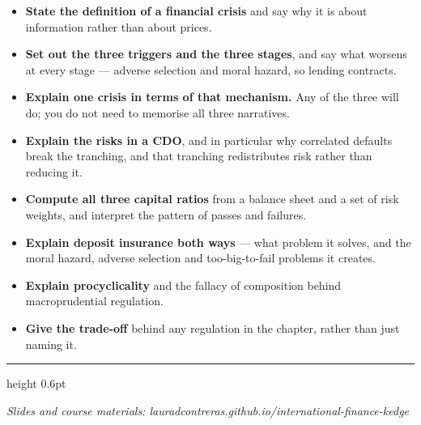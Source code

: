 \documentclass[11pt,a4paper]{article}
\begin{document}
\begin{itemize}
\item \textbf{State the definition of a financial crisis} and say why it is
about information rather than about prices.
\item \textbf{Set out the three triggers and the three stages}, and say what
worsens at every stage --- adverse selection and moral hazard, so lending
contracts.
\item \textbf{Explain one crisis in terms of that mechanism.} Any of the three
will do; you do not need to memorise all three narratives.
\item \textbf{Explain the risks in a CDO}, and in particular why correlated
defaults break the tranching, and that tranching redistributes risk rather than
reducing it.
\item \textbf{Compute all three capital ratios} from a balance sheet and a set
of risk weights, and interpret the pattern of passes and failures.
\item \textbf{Explain deposit insurance both ways} --- what problem it solves,
and the moral hazard, adverse selection and too-big-to-fail problems it creates.
\item \textbf{Explain procyclicality} and the fallacy of composition behind
macroprudential regulation.
\item \textbf{Give the trade-off} behind any regulation in the chapter, rather
than just naming it.
\end{itemize}

\vspace{8pt}
{\color{ifrule}\hrule height 0.6pt}
\vspace{4pt}
{\color{ifgrey}\small\itshape Slides and course materials:
lauradcontreras.github.io/international-finance-kedge}
\end{document}
